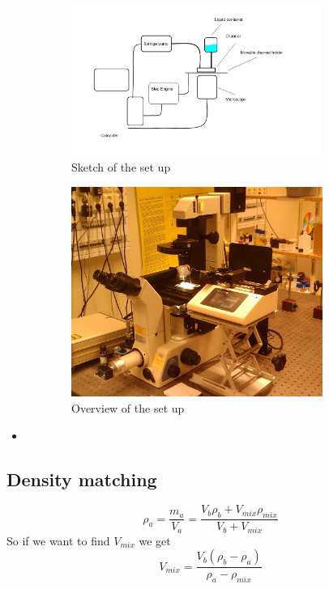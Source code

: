 \begin{figure}[H]
\centering
\begin{subfigure}[b]{0.45\textwidth}
\includegraphics[width=0.9\textwidth]{figures/method/setupsketch.png}
\caption{Sketch of the set up}\label{fig:setupsketch}
\end{subfigure}
\begin{subfigure}[b]{0.45\textwidth}
\includegraphics[width=0.9\textwidth]{figures/method/ExperimentalOverview.jpg}
\caption{Overview of the set up}\label{fig:setuppicture}
\end{subfigure}
\caption{}
\label{fig:experimentalsetup}
\end{figure}

\begin{itemize}
\item 
\end{itemize}


\subsection{Density matching}


\begin{equation}
\rho_{a} = 	\frac {m_{a}}{V_{a}} =
				\frac{V_{b}\rho_{b} + V_{mix}\rho_{mix}}{V_b + V_{mix}} 
\end{equation}
So if we want to find $V_{mix}$ we get
\begin{equation}
V_{mix} = \frac{ V_{b}(\rho_{b} - \rho_{a})}{\rho_{a} - \rho_{mix}} 
\end{equation}

